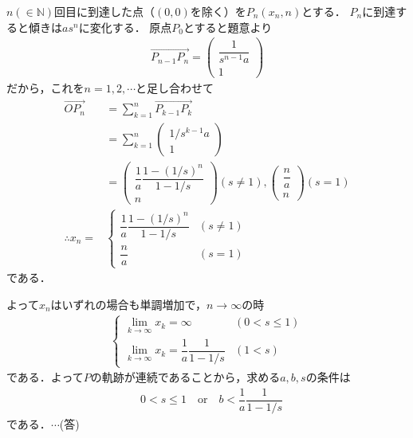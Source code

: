 \documentclass[../../main.tex]{subfiles}
\begin{document}
$n (\in\mathbb{N})$回目に到達した点（$(0,0)$を除く）を$P_n(x_n,n)$とする．
$P_n$に到達すると傾きは$as^{n}$に変化する．
原点$P_0$とすると題意より
\begin{align}
  \overrightarrow{P_{n-1}P_n} =
  \begin{pmatrix}
    \dfrac{1}{s^{n-1}a} \\
    1
  \end{pmatrix} \label{eq:1}
\end{align}
だから，これを$n=1,2,\cdots$と足し合わせて
\begin{align}
  \overrightarrow{OP_n}
  &= \sum_{k=1}^{n} \overrightarrow{P_{k-1}P_{k}} \\
  &= \sum_{k=1}^{n}
  \begin{pmatrix} 1/s^{k-1}a \\ 1
  \end{pmatrix} \\
  &=
  \begin{pmatrix}
    \dfrac{1}{a} \dfrac{1-(1/s)^{n}}{1-1/s} \\ n
  \end{pmatrix} (s \neq 1),
  \begin{pmatrix}
    \dfrac{n}{a} \\ n
  \end{pmatrix} (s = 1) \\
  \therefore
  x_n = &
  \begin{cases}
    \dfrac{1}{a} \dfrac{1-(1/s)^{n}}{1-1/s} & (s \neq 1) \\
    \dfrac{n}{a} & (s = 1)
  \end{cases}
\end{align}
である．

よって$x_n$はいずれの場合も単調増加で，$n\to\infty$の時
\begin{align}
  \begin{cases}
    \lim_{k\to\infty}x_k = \infty & (0<s\le 1) \\
    \lim_{k\to\infty}x_k = \dfrac{1}{a}\dfrac{1}{1-1/s} & (1<s)
  \end{cases}
\end{align}
である．よって$P$の軌跡が連続であることから，求める$a,b,s$の条件は
\begin{align}
  &0<s\le1 \quad\text{or}\quad b<\dfrac{1}{a}\dfrac{1}{1-1/s}
\end{align}
である．$\cdots$(答)

\newpage
\end{document}

